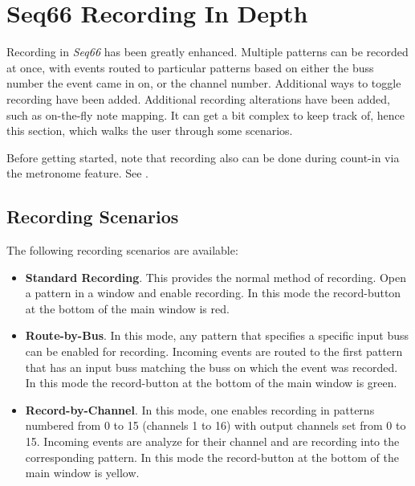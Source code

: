 %
%
%

\section{Seq66 Recording In Depth}
\label{sec:recording}

   Recording in \textsl{Seq66} has been greatly enhanced.
   Multiple patterns can be recorded at once, with events
   routed to particular patterns based on either the buss number the event came
   in on, or the channel number.
   Additional ways to toggle recording have been added.
   Additional recording alterations have been added, such as on-the-fly note
   mapping.
   It can get a bit complex to keep track of, hence this section,
   which walks the user through some scenarios.

   Before getting started, note that recording also
   can be done during count-in via the metronome feature.
   See .

\subsection{Recording Scenarios}
\label{sec:recording_scenarios}

   The following recording scenarios are available:

   \begin{itemize}
      \item \textbf{Standard Recording}.
         This provides the normal method of recording. Open a pattern in a
         window and enable recording.
         In this mode the record-button at the bottom of the main window
         is red.
      \item \textbf{Route-by-Bus}.
         In this mode, any pattern that specifies a specific input buss
         can be enabled for recording.
         Incoming events are routed to the first pattern that has an input
         buss matching the buss on which the event was recorded.
         In this mode the record-button at the bottom of the main window
         is green.
      \item \textbf{Record-by-Channel}.
         In this mode, one enables recording in patterns numbered from 0 to 15
         (channels 1 to 16) with output channels set from 0 to 15.
         Incoming events are analyze for their channel and are recording into
         the corresponding pattern.
         In this mode the record-button at the bottom of the main window
         is yellow.
   \end{itemize}

